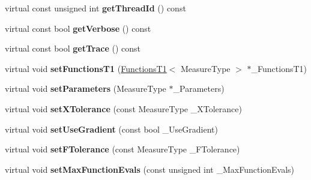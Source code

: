 \begin{DoxyCompactItemize}
\item 
\hypertarget{class_ox_1_1_fitter_a68e317f1c05ea2aa24f9d4803ee19215}{virtual const unsigned int {\bfseries get\-Thread\-Id} () const }\label{class_ox_1_1_fitter_a68e317f1c05ea2aa24f9d4803ee19215}

\item 
\hypertarget{class_ox_1_1_fitter_afeba16a2218db1f3fc646e2dde75f386}{virtual const bool {\bfseries get\-Verbose} () const }\label{class_ox_1_1_fitter_afeba16a2218db1f3fc646e2dde75f386}

\item 
\hypertarget{class_ox_1_1_fitter_a9c3401372be5c8698464deb05c0f5533}{virtual const bool {\bfseries get\-Trace} () const }\label{class_ox_1_1_fitter_a9c3401372be5c8698464deb05c0f5533}

\item 
\hypertarget{class_ox_1_1_fitter_acf5be118a916c6b52034191f1bdaf790}{virtual void {\bfseries set\-Functions\-T1} (\hyperlink{class_ox_1_1_functions_t1}{Functions\-T1}$<$ Measure\-Type $>$ $\ast$\-\_\-\-Functions\-T1)}\label{class_ox_1_1_fitter_acf5be118a916c6b52034191f1bdaf790}

\item 
\hypertarget{class_ox_1_1_fitter_ab97f65c7d4d4db9bb0f5934aa0601b73}{virtual void {\bfseries set\-Parameters} (Measure\-Type $\ast$\-\_\-\-Parameters)}\label{class_ox_1_1_fitter_ab97f65c7d4d4db9bb0f5934aa0601b73}

\item 
\hypertarget{class_ox_1_1_fitter_ad2b680ee88b12dd51538a2da865b2589}{virtual void {\bfseries set\-X\-Tolerance} (const Measure\-Type \-\_\-\-X\-Tolerance)}\label{class_ox_1_1_fitter_ad2b680ee88b12dd51538a2da865b2589}

\item 
\hypertarget{class_ox_1_1_fitter_a2441247888adc90a26d779043f10c5e1}{virtual void {\bfseries set\-Use\-Gradient} (const bool \-\_\-\-Use\-Gradient)}\label{class_ox_1_1_fitter_a2441247888adc90a26d779043f10c5e1}

\item 
\hypertarget{class_ox_1_1_fitter_aca7109a663e737c46cb29483c2276f4a}{virtual void {\bfseries set\-F\-Tolerance} (const Measure\-Type \-\_\-\-F\-Tolerance)}\label{class_ox_1_1_fitter_aca7109a663e737c46cb29483c2276f4a}

\item 
\hypertarget{class_ox_1_1_fitter_a293d2876b8b053bd637c35c3f6f3f68e}{virtual void {\bfseries set\-Max\-Function\-Evals} (const unsigned int \-\_\-\-Max\-Function\-Evals)}\label{class_ox_1_1_fitter_a293d2876b8b053bd637c35c3f6f3f68e}


\end{DoxyCompactItemize}
